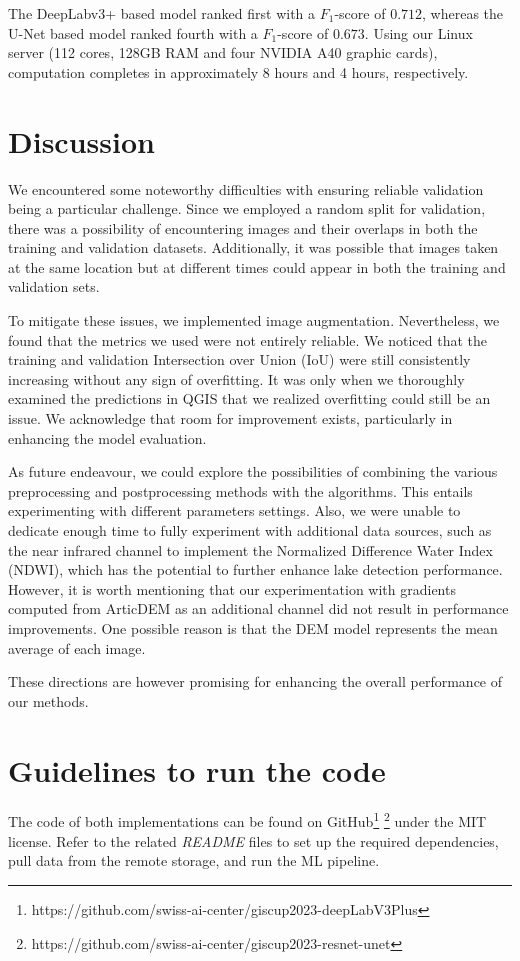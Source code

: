 \documentclass[sigconf]{acmart}
\begin{document}
The DeepLabv3+ based model ranked first with a $F_1$-score of $0.712$, whereas the U-Net based model ranked fourth with a $F_1$-score of $0.673$.
Using our Linux server (112 cores, 128GB RAM and four NVIDIA A40 graphic cards), computation completes in approximately 8 hours and 4 hours, respectively.

\section{Discussion}
We encountered some noteworthy difficulties with ensuring reliable validation being a particular challenge. Since we employed a random split for validation, there was a possibility of encountering images and their overlaps in both the training and validation datasets. Additionally, it was possible that images taken at the same location but at different times could appear in both the training and validation sets.

To mitigate these issues, we implemented image augmentation. Nevertheless, we found that the metrics we used were not entirely reliable. We noticed that the training and validation Intersection over Union (IoU) were still consistently increasing without any sign of overfitting. It was only when we thoroughly examined the predictions in QGIS that we realized overfitting could still be an issue. We acknowledge that room for improvement exists, particularly in enhancing the model evaluation.

As future endeavour, we could explore the possibilities of combining the various preprocessing and postprocessing methods with the algorithms. This entails
experimenting with different parameters settings. Also, we were unable to dedicate enough time to fully experiment with additional data sources, such as the near infrared channel to implement the Normalized Difference Water Index (NDWI), which has the potential to further enhance lake detection performance. However, it is worth mentioning that our experimentation with gradients computed from ArticDEM as an additional channel did not result in performance improvements. One possible reason is that the DEM model represents the mean average of each image.

These directions are however promising for enhancing the overall performance of our methods.

\section{Guidelines to run the code}
The code of both implementations can be found on GitHub\footnote{https://github.com/swiss-ai-center/giscup2023-deepLabV3Plus} \footnote{https://github.com/swiss-ai-center/giscup2023-resnet-unet} under the MIT license. Refer to the related \emph{README} files to set up the required dependencies, pull data from the remote storage, and run the ML pipeline.
\end{document}
